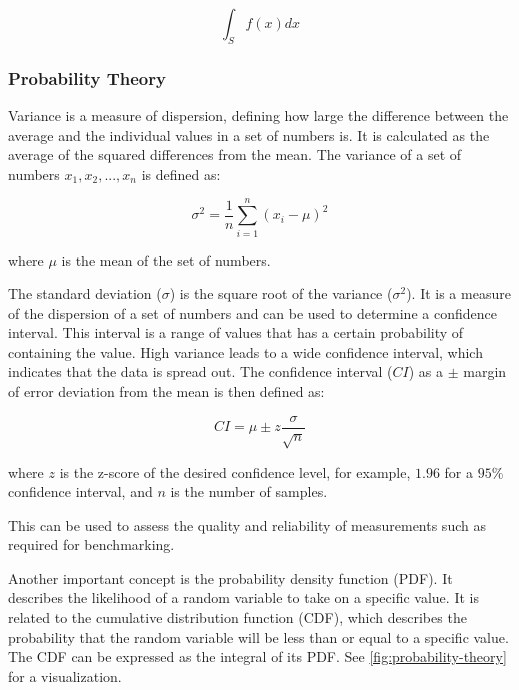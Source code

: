 \begin{equation}
  \label{eqn:integral-domain}
  \int_{S} f(x) dx
\end{equation}

\subsubsection{Probability Theory}
\label{sec:probabilityTheory}

Variance is a measure of dispersion, defining how large the difference between the average and the individual values in a set of numbers is. It is calculated as the average of the squared differences from the mean. The variance of a set of numbers $x_1, x_2, ..., x_n$ is defined as:

\begin{equation}
  \label{eqn:variance}
  \sigma^2 = \frac{1}{n} \sum_{i=1}^{n} (x_i - \mu)^2
\end{equation}

where $\mu$ is the mean of the set of numbers.

The standard deviation ($\sigma$) is the square root of the variance ($\sigma^2$). It is a measure of the dispersion of a set of numbers and can be used to determine a confidence interval. This interval is a range of values that has a certain probability of containing the value. High variance leads to a wide confidence interval, which indicates that the data is spread out. The confidence interval ($CI$) as a $\pm$ margin of error deviation from the mean is then defined as:

\begin{equation}
  \label{eqn:confidence-interval}
  CI = \mu \pm z \frac{\sigma}{\sqrt{n}}
\end{equation}

where $z$ is the z-score of the desired confidence level, for example, $1.96$ for a $95\%$ confidence interval, and $n$ is the number of samples.

This can be used to assess the quality and reliability of measurements such as required for benchmarking.

Another important concept is the probability density function (\gls{PDF}). It describes the likelihood of a random variable to take on a specific value. It is related to the cumulative distribution function (\gls{CDF}), which describes the probability that the random variable will be less than or equal to a specific value. The \gls{CDF} can be expressed as the integral of its \gls{PDF}. See \autoref{fig:probability-theory} for a visualization.

